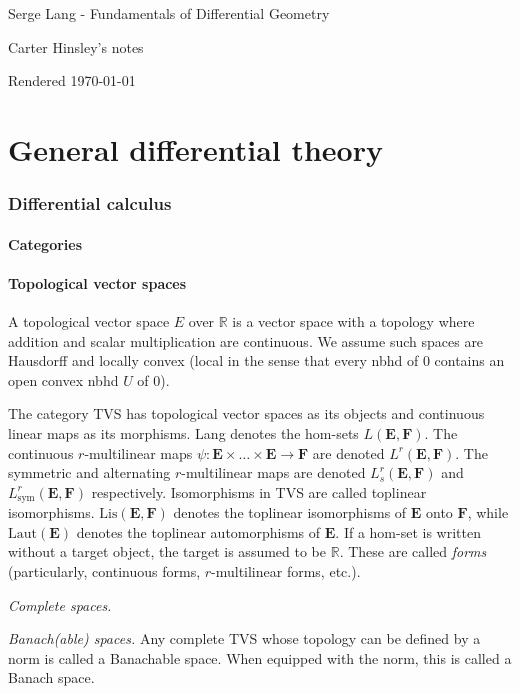\documentclass[a4paper]{article}
\newcommand{\R}{\mathbb{R}}
\begin{document}
\begin{center}
\Large{Serge Lang - Fundamentals of Differential Geometry}

\large{Carter Hinsley's notes}

Rendered \today
\end{center}

\part{General differential theory}

\section{Differential calculus}

\subsection{Categories}

\subsection{Topological vector spaces}

A topological vector space $E$ over $\R$ is a vector space with a topology where addition and scalar multiplication are continuous. We assume such spaces are Hausdorff and locally convex (local in the sense that every nbhd of $0$ contains an open convex nbhd $U$ of $0$).

The category TVS has topological vector spaces as its objects and continuous linear maps as its morphisms. Lang denotes the hom-sets $L(\mathbf{E}, \mathbf{F})$. The continuous $r$-multilinear maps $\psi: \mathbf{E} \times \ldots \times \mathbf{E} \to \mathbf{F}$ are denoted $L^r(\mathbf{E}, \mathbf{F})$. The symmetric and alternating $r$-multilinear maps are denoted $L_s^r(\mathbf{E}, \mathbf{F})$ and $L_{\text{sym}}^r(\mathbf{E}, \mathbf{F})$ respectively. Isomorphisms in TVS are called toplinear isomorphisms. $\text{Lis}(\mathbf{E}, \mathbf{F})$ denotes the toplinear isomorphisms of $\mathbf{E}$ onto $\mathbf{F}$, while $\text{Laut}(\mathbf{E})$ denotes the toplinear automorphisms of $\mathbf{E}$. If a hom-set is written without a target object, the target is assumed to be $\R$. These are called \emph{forms} (particularly, continuous forms, $r$-multilinear forms, etc.).

\emph{Complete spaces.} 

\emph{Banach(able) spaces.} Any complete TVS whose topology can be defined by a norm is called a Banachable space. When equipped with the norm, this is called a Banach space.
\end{document}

